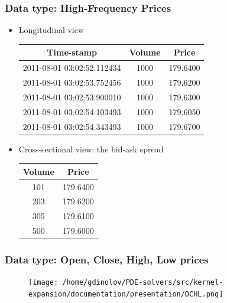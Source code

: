 \documentclass{beamer}
\begin{document}
\begin{frame}
\frametitle{Data type: High-Frequency Prices}

\begin{itemize}
  \item Longitudinal view
\begin{table}
\begin{tabular}{|c|c|c|}
  Time-stamp & Volume& Price \\
  \hline
  2011-08-01 03:02:52.112434 & 1000 & 179.6400 \\
  \hline
  2011-08-01 03:02:53.752456 & 1000 & 179.6200 \\
  \hline
  2011-08-01 03:02:53.900010 & 1000 & 179.6300 \\
  \hline
  2011-08-01 03:02:54.103493 & 1000 & 179.6050 \\
  \hline
  2011-08-01 03:02:54.343493 & 1000 & 179.6700 \\
\end{tabular}
\end{table}

\item Cross-sectional view: the bid-ask spread
  \begin{table}
  \begin{tabular}{c|c}
    Volume & Price \\
    \hline \hline
    101 & 179.6400 \\
    203 & 179.6200 \\
    \hline
    305 & 179.6100 \\
    500 & 179.6000 \\
  \end{tabular}
  \end{table}
\end{itemize}
\end{frame}


\begin{frame}
\frametitle{Data type: Open, Close, High, Low prices}

\begin{figure}
  \texttt{[image: /home/gdinolov/PDE-solvers/src/kernel-expansion/documentation/presentation/OCHL.png]}
\end{figure}

\end{frame}

\end{document}
